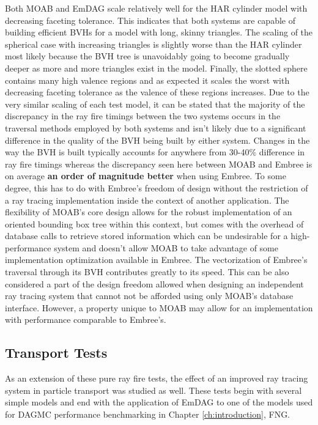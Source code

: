 Both MOAB and EmDAG scale relatively well for the HAR cylinder model with
decreasing faceting tolerance. This indicates that both systems are capable of
building efficient BVHs for a model with long, skinny triangles. The scaling of
the spherical case with increasing triangles is slightly worse than the HAR
cylinder most likely because the BVH tree is unavoidably going to become
gradually deeper as more and more triangles exist in the model. Finally, the
slotted sphere contains many high valence regions and as expected it scales the
worst with decreasing faceting tolerance as the valence of these regions
increases. Due to the very similar scaling of each test model, it can be stated
that the majority of the discrepancy in the ray fire timings between the two
systems occurs in the traversal methods employed by both systems and isn't
likely due to a significant difference in the quality of the BVH being built
by either system. Changes in the way the BVH is built typically accounts for
anywhere from 30-40\% difference in ray fire timings whereas the discrepancy
seen here between MOAB and Embree is on average \textbf{an order of magnitude
  better} when using Embree. To some degree, this has to do with Embree's freedom
of design without the restriction of a ray tracing implementation inside the
context of another application. The flexibility of MOAB's core design allows for the
robust implementation of an oriented bounding box tree within this context, but
comes with the overhead of database calls to retrieve stored information which
can be undesirable for a high-performance system and doesn't allow MOAB to take
advantage of some implementation optimization available in Embree. The
vectorization of Embree's traversal through its BVH contributes greatly to its
speed. This can be also considered a part of the design freedom allowed when
designing an independent ray tracing system that cannot not be afforded using
only MOAB's database interface. However, a property unique to MOAB may allow for
an implementation with performance comparable to Embree's.

\subsection{Transport Tests}
\label{subsec:emdag_transport}

As an extension of these pure ray fire tests, the effect of an improved ray
tracing system in particle transport was studied as well. These tests begin with
several simple models and end with the application of EmDAG to one of the models
used for DAGMC performance benchmarking in Chapter \ref{ch:introduction}, FNG.

